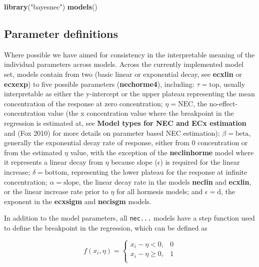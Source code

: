 \documentclass[10pt,a4paper,onecolumn]{article}
\newenvironment{Shaded}{\begin{snugshade}}{\end{snugshade}}
\newcommand{\KeywordTok}[1]{\textcolor[rgb]{0.13,0.29,0.53}{\textbf{#1}}}
\newcommand{\NormalTok}[1]{#1}
\newcommand{\StringTok}[1]{\textcolor[rgb]{0.31,0.60,0.02}{#1}}
\begin{document}
\begin{Shaded}
\begin{Highlighting}[]
\KeywordTok{library}\NormalTok{(}\StringTok{"bayesnec"}\NormalTok{)}
\KeywordTok{models}\NormalTok{()}
\end{Highlighting}
\end{Shaded}

\hypertarget{parameter-definitions}{%
\subsection{Parameter definitions}\label{parameter-definitions}}

Where possible we have aimed for consistency in the interpretable
meaning of the individual parameters across models. Across the currently
implemented model set, models contain from two (basic linear or
exponential decay, see \textbf{ecxlin} or \textbf{ecxexp}) to five
possible parameters (\textbf{nechorme4}), including:
\(\tau = \text{top}\), usually interpretable as either the y-intercept
or the upper plateau representing the mean concentration of the response
at zero concentration; \(\eta = \text{NEC}\), the
no-effect-concentration value (the x concentration value where the
breakpoint in the regression is estimated at, see \textbf{Model types
for NEC and ECx estimation} and (Fox 2010) for more details on parameter
based NEC estimation); \(\beta = \text{beta}\), generally the
exponential decay rate of response, either from 0 concentration or from
the estimated \(\eta\) value, with the exception of the
\textbf{neclinhorme} model where it represents a linear decay from
\(\eta\) because slope (\(\epsilon\)) is required for the linear
increase; \(\delta = \text{bottom}\), representing the lower plateau for
the response at infinite concentration; \(\alpha = \text{slope}\), the
linear decay rate in the models \textbf{neclin} and \textbf{ecxlin}, or
the linear increase rate prior to \(\eta\) for all hormesis models; and
\(\epsilon = \text{d}\), the exponent in the \textbf{ecxsigm} and
\textbf{necisgm} models.

In addition to the model parameters, all \texttt{nec...} models have a
step function used to define the breakpoint in the regression, which can
be defined as

\[
f(x_i, \eta) = \begin{cases} 
      x_i - \eta < 0, & 0 \\
      x_i - \eta \geq 0, & 1 \\
   \end{cases}
\]
\end{document}
